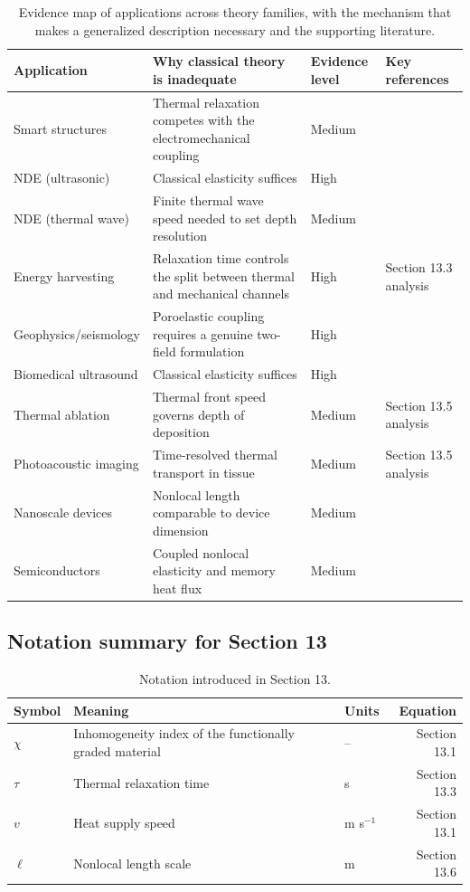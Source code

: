 \begin{table}[h]
\centering
\small
\caption{Evidence map of applications across theory families, with the mechanism that makes a generalized description necessary and the supporting literature.}
\label{tab:evidence_map}
\begin{tabularx}{\textwidth}{@{}lXlX@{}}
\toprule
\textbf{Application} & \textbf{Why classical theory is inadequate} & \textbf{Evidence level} & \textbf{Key references} \\
\midrule
Smart structures & Thermal relaxation competes with the electromechanical coupling & Medium & \cite{Abouelregal2023} \\
NDE (ultrasonic) & Classical elasticity suffices & High & \cite{Achenbach1973} \\
NDE (thermal wave) & Finite thermal wave speed needed to set depth resolution & Medium & \cite{Joseph1989,Joseph1990} \\
Energy harvesting & Relaxation time controls the split between thermal and mechanical channels & High & Section 13.3 analysis \\
Geophysics/seismology & Poroelastic coupling requires a genuine two-field formulation & High & \cite{Cowin1983,Iesan1986} \\
Biomedical ultrasound & Classical elasticity suffices & High & \cite{Achenbach1973} \\
Thermal ablation & Thermal front speed governs depth of deposition & Medium & Section 13.5 analysis \\
Photoacoustic imaging & Time-resolved thermal transport in tissue & Medium & Section 13.5 analysis \\
Nanoscale devices & Nonlocal length comparable to device dimension & Medium & \cite{Maranganti2007,Maranganti2006} \\
Semiconductors & Coupled nonlocal elasticity and memory heat flux & Medium & \cite{Gupta2026HeatMap} \\
\bottomrule
\end{tabularx}
\end{table}

\subsection{Notation summary for Section 13}

\begin{table}[h]
\centering
\small
\caption{Notation introduced in Section 13.}
\label{tab:notation-sec13}
\begin{tabularx}{\textwidth}{@{}lXlr@{}}
\toprule
\textbf{Symbol} & \textbf{Meaning} & \textbf{Units} & \textbf{Equation} \\
\midrule
$\chi$ & Inhomogeneity index of the functionally graded material & -- & Section 13.1 \\
$\tau$ & Thermal relaxation time & s & Section 13.3 \\
$v$ & Heat supply speed & m s$^{-1}$ & Section 13.1 \\
$\ell$ & Nonlocal length scale & m & Section 13.6 \\
\bottomrule
\end{tabularx}
\end{table}

